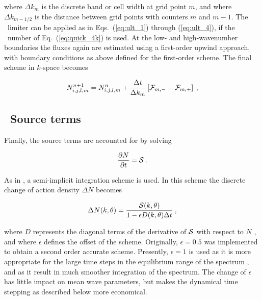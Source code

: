 \noindent
where $\Delta k_m$ is the discrete band or cell width at grid point $m$, and
where $\Delta k_{m-1/2}$ is the distance between grid points with counters $m$
and $m-1$. The \ult\ limiter can be applied as in Eqs.~(\ref{eq:ult_1})
through (\ref{eq:ult_4}), if the \cfl\ number of Eq.~(\ref{eq:quick_4k}) is
used. At the low- and high-wavenumber boundaries the fluxes again are
estimated using a first-order upwind approach, with boundary conditions as
above defined for the first-order scheme. The final scheme in $k$-space
becomes


\begin{equation}
N_{i,j,l,m}^{n+1} = N_{i,j,l,m}^n 
 + \frac{\Delta t}{\Delta k_m} \left [ {\cal F}_{m,-} - {\cal F}_{m,+} \right ]
\: , \label{eq:uq_k_tot} \end{equation}


\vssub
\subsection{~Source terms} \label{sub:source}
\vssub

Finally, the source terms are accounted for by solving


\begin{equation}
\frac{\partial N}{\partial t} = {\cal S} \: . \label{eq:step_source}
\end{equation}

\noindent 
As in \wam, a semi-implicit integration scheme is used. In this scheme the
discrete change of action density $\Delta N$ becomes \citep{art:WAM88}


\begin{equation}
\Delta N(k,\theta) = \frac{{\cal S}(k,\theta)}{1- \epsilon D(k,\theta)\Delta t}
\: , \label{eq:implicit_st} \end{equation}

\noindent 
where $D$ represents the diagonal terms of the derivative of ${\cal S}$ with
respect to $N$ \citep[Eqs. 4.1 through 4.10]{art:WAM88}, and where $\epsilon$
defines the offset of the scheme. Originally, $\epsilon = 0.5$ was implemented
to obtain a second order accurate scheme. Presently, $\epsilon = 1$ is used as
it is more appropriate for the large time steps in the equilibrium range of
the spectrum \citep{pro:HA98,art:HA01}, and as it result in much smoother
integration of the spectrum. The change of $\epsilon$ has little impact on
mean wave parameters, but makes the dynamical time stepping as described below
more economical.

